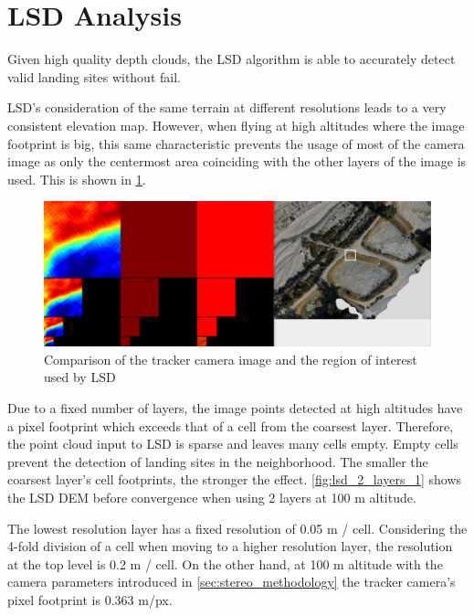 \section{LSD Analysis}\label{sec:eval_LSD}

Given high quality depth clouds, the LSD algorithm is able to accurately detect valid landing sites without fail.

LSD's consideration of the same terrain at different resolutions leads to a very consistent elevation map. However, when flying at high altitudes where the image footprint is big, this same characteristic prevents the usage of most of the camera image as only the centermost area coinciding with the other layers of the image is used. This is shown in \cref{fig:LSD_center_usage}.

\begin{figure}[h]
\centering
\includegraphics[scale=0.14]{images/evaluation/LSD_center_usage.png}
\caption{Comparison of the tracker camera image and the region of interest used by LSD}
\label{fig:LSD_center_usage}
\end{figure}

Due to a fixed number of layers, the image points detected at high altitudes have a pixel footprint which exceeds that of a cell from the coarsest layer. Therefore, the point cloud input to LSD is sparse and leaves many cells empty. Empty cells prevent the detection of landing sites in the neighborhood. The smaller the coarsest layer's cell footprints, the stronger the effect. \cref{fig:lsd_2_layers_1} shows the LSD DEM before convergence when using 2 layers at 100 m altitude.

The lowest resolution layer has a fixed resolution of 0.05 m / cell. Considering the 4-fold division of a cell when moving to a higher resolution layer, the resolution at the top level is 0.2 m / cell. On the other hand, at 100 m altitude with the camera parameters introduced in \cref{sec:stereo_methodology} the tracker camera's pixel footprint is 0.363 m/px. 

